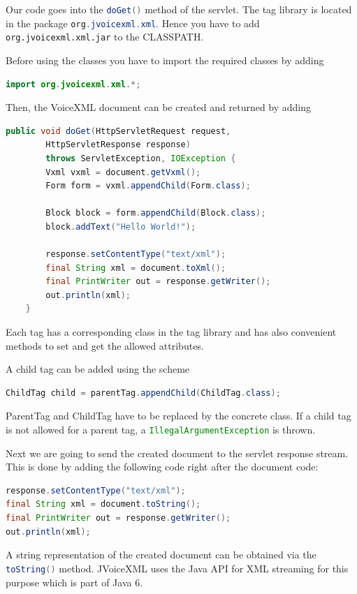 \documentclass[11pt,a4paper]{book}
\begin{document}
Our code goes into the \lstinline[language=Java]{doGet()} method of the servlet. The tag library
is located in the package \lstinline[language=Java]{org.jvoicexml.xml}. Hence you have to add
\texttt{org.jvoicexml.xml.jar} to the CLASSPATH.

Before using the classes you have to import the required classes by adding
\begin{lstlisting}[language=Java]
import org.jvoicexml.xml.*;
\end{lstlisting}

Then, the VoiceXML document can be created and returned by adding
\begin{lstlisting}[language=Java]
    public void doGet(HttpServletRequest request,
        HttpServletResponse response)
        throws ServletException, IOException {
        Vxml vxml = document.getVxml();
        Form form = vxml.appendChild(Form.class);

        Block block = form.appendChild(Block.class);
        block.addText("Hello World!");

        response.setContentType("text/xml");
        final String xml = document.toXml();
        final PrintWriter out = response.getWriter();
        out.println(xml);
    }
\end{lstlisting}

Each tag has a corresponding class in the tag library and has also convenient
methods to set and get the allowed attributes.

A child tag can be added using the scheme
\begin{lstlisting}[language=Java]
ChildTag child = parentTag.appendChild(ChildTag.class);
\end{lstlisting}

ParentTag and ChildTag have to be replaced by the concrete class. If a child
tag is not allowed for a parent tag, a \lstinline[language=Java]{IllegalArgumentException} is
thrown.

Next we are going to send the created document to the servlet response stream.
This is done by adding the following code right after the document code:

\begin{lstlisting}[language=Java]
response.setContentType("text/xml");
final String xml = document.toString();
final PrintWriter out = response.getWriter();
out.println(xml);
\end{lstlisting}

A string representation of the created document can be obtained via the
\lstinline[language=Java]{toString()} method. JVoiceXML uses the Java API for
XML streaming for this purpose which is part of Java 6.
\end{document}
